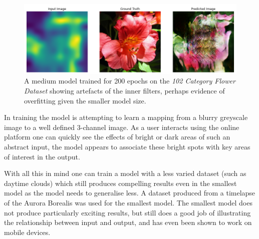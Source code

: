 \documentclass{article}
\begin{document}
\begin{figure}[h!]
	\centering
	\includegraphics[scale=0.3]{artefacts}
	\caption{A medium model trained for 200 epochs on the \textit{102 Category Flower Dataset}\cite{flowers_dataset} showing artefacts of the inner filters, perhaps evidence of overfitting given the smaller model size.}
	\label{fig:kernelsInOutput}
\end{figure}


In training the model is attempting to learn a mapping from a blurry greyscale image to a well defined 3-channel image. As a user interacts using the online platform one can quickly see the effects of bright or dark areas of such an abstract input, the model appears to associate these bright spots with key areas of interest in the output.

With all this in mind one can train a model with a less varied dataset (such as daytime clouds) which still produces compelling results even in the smallest model as the model needs to generalise less. A dataset produced from a timelapse of the Aurora Borealis was used for the smallest model. The smallest model does not produce particularly exciting results, but still does a good job of illustrating the relationship between input and output, and has even been shown to work on mobile devices.
\end{document}
